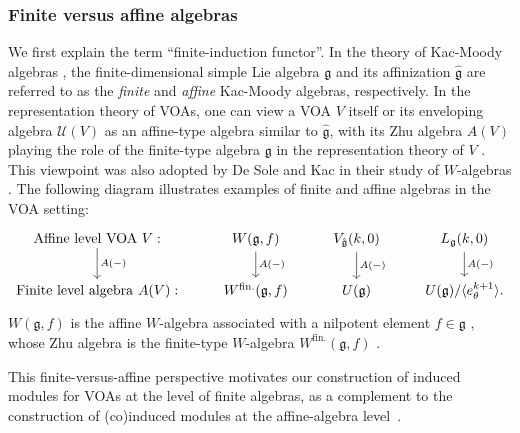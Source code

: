 \documentclass[12pt,a4paper,reqno]{amsart}
\numberwithin{equation}{section}
\numberwithin{equation}{section}
\theoremstyle{definition}
\def \g {\mathfrak{g}}
\def\scrU{\mathscr{U}}
\def\<{\langle}
\def\>{\rangle}
\begin{document}
		
	
	
		\subsubsection*{Finite versus affine algebras} We first explain the term ``finite-induction functor''. 
	In the theory of Kac-Moody algebras \cite{Kac90}, the finite-dimensional simple Lie algebra $\g$ and its affinization $\hat{\g}$ are referred to as the {\em finite} and {\em affine} Kac-Moody algebras, respectively. In the representation theory of VOAs, one can view a VOA $V$ itself or its enveloping algebra $\scrU(V)$ as an affine-type algebra similar to $\hat{\g}$, with its Zhu algebra $A(V)$ playing the role of the finite-type algebra $\g$ in the representation theory of $V$ \cite{FZ92}. This viewpoint was also adopted by De Sole and Kac in their study of $W$-algebras \cite{DSK06,DSKV16}.  %
	The following diagram illustrates examples of finite and affine algebras in the VOA setting:  %
	\begin{equation}\label{eq:finitvsaffine}
		\begin{tikzcd}
			\mathrm{Affine\ level\ VOA}\ V: \arrow[d,"A(-)"] & W(\g,f)\arrow[d,"A(-)"] & V_{\hat{\g}}(k,0) \arrow[d,"A(-)"] & L_{\g}(k,0) \arrow[d,"A(-)"]\\
			\mathrm{Finite\ level\ algebra}\ A(V): & W^{\mathrm{fin.}}(\g,f) & U(\g) & U(\g)/\<e_\theta^{k+1}\>.
		\end{tikzcd}
	\end{equation}
$W(\g,f)$ is the affine $W$-algebra associated with a nilpotent element $f\in \g$ \cite{A15,DSK06}, whose Zhu algebra is the finite-type $W$-algebra $W^{\mathrm{fin.}}(\g,f)$ \cite{Lo10}. 

This finite-versus-affine perspective motivates our construction of induced modules for VOAs at the level of finite algebras, as a complement to the construction of (co)induced modules at the affine-algebra level~\cite{DLin96}.

	
\end{document}
